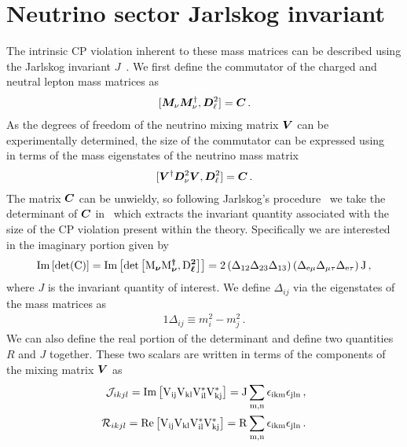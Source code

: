 \section{Neutrino sector Jarlskog invariant}
\label{sec:jscalar}
The intrinsic CP violation inherent to these mass matrices can be described using the Jarlskog invariant $J$~\citep{jarlskog1985basis,jarlskog1985commutator,jarlskog2005invariants}. We first define the commutator of the charged and neutral lepton mass matrices as 
\begin{alignat}{1}
	\label{comm:1} [\boldsymbol{M}_{\nu}\boldsymbol{M}_{\nu}^{\dagger},\boldsymbol{D}_{\ell}^{2}] = \boldsymbol{C}\,.
\end{alignat}
As the degrees of freedom of the neutrino mixing matrix $\boldsymbol{V}$ can be experimentally determined, the size of the commutator can be expressed using~ in terms of the mass eigenstates of the neutrino mass matrix
\begin{alignat}{1}
	\label{comm:2} [\boldsymbol{V}^{\dagger}\boldsymbol{D}_{\nu}^{2}\boldsymbol{V},\boldsymbol{D}_{\ell}^{2}] = \boldsymbol{C}\,.
\end{alignat}
The matrix $\boldsymbol{C}$ can be unwieldy, so following Jarlskog's procedure~\citep{jarlskog1985commutator,jarlskog1985basis,jarlskog2005invariants} we take the determinant of $\boldsymbol{C}$ in~ which extracts the invariant quantity associated with the size of the CP violation present within the theory. Specifically we are interested in the imaginary portion given by
\begin{alignat}{1}
	\label{det:1} \rm{Im}\left[\rm{det}(\boldsymbol{C})\right]=\rm{Im}\left[\rm{det}\left[\boldsymbol{M_{\nu}}\boldsymbol{M_{\nu}^{\dagger}},\boldsymbol{D_{\ell}^{2}}\right]\right]=2\left(\Delta_{12}\Delta_{23}\Delta_{13}\right)\left(\Delta_{e\mu}\Delta_{\mu\tau}\Delta_{e\tau}\right)J\,,
\end{alignat}
where $J$ is the invariant quantity of interest. We define $\Delta_{ij}$ via the eigenstates of the mass matrices as
\begin{alignat}{1}
	\label{delta:1} \Delta_{ij}\equiv m^{2}_{i}-m^{2}_{j}\,.
\end{alignat}
We can also define the real portion of the determinant and define two quantities $R$ and $J$ together. These two scalars are written in terms of the components of the mixing matrix $\boldsymbol{V}$ as
\begin{alignat}{1}
	\label{j:1}
    {\mathcal J}_{ikjl} = \rm{Im}\left[V_{ij}V_{kl}V^{*}_{il}V^{*}_{kj}\right]=J\sum_{m,n}\epsilon_{ikm}\epsilon_{jln}\,,\\
    \label{j:2}
    {\mathcal R}_{ikjl} = \rm{Re}\left[V_{ij}V_{kl}V^{*}_{il}V^{*}_{kj}\right]=R\sum_{m,n}\epsilon_{ikm}\epsilon_{jln}\,.
\end{alignat}
